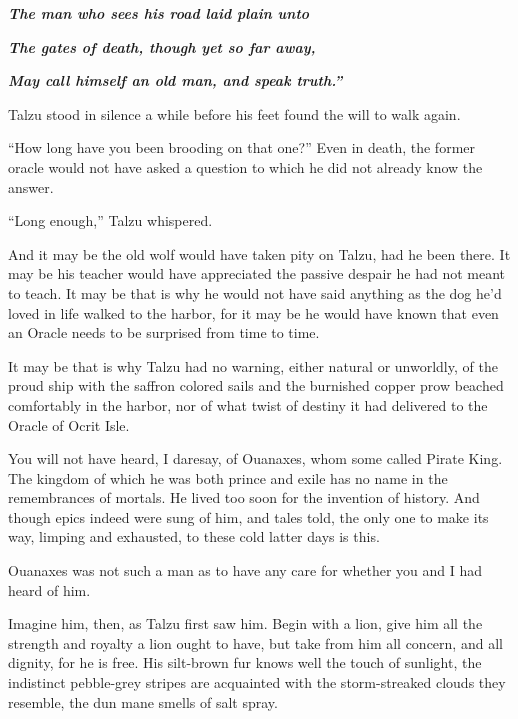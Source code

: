 \emph{\textbf{The man who sees his road laid plain unto}}

\emph{\textbf{The gates of death, though yet so far away,}}

\emph{\textbf{May call himself an old man, and speak truth.''}}

Talzu stood in silence a while before his feet found the will to walk again.

``How long have you been brooding on that one?'' Even in death, the former oracle would not have asked a question to which he did not already know the answer.

``Long enough,'' Talzu whispered.

And it may be the old wolf would have taken pity on Talzu, had he been there. It may be his teacher would have appreciated the passive despair he had not meant to teach. It may be that is why he would not have said anything as the dog he'd loved in life walked to the harbor, for it may be he would have known that even an Oracle needs to be surprised from time to time.

It may be that is why Talzu had no warning, either natural or unworldly, of the proud ship with the saffron colored sails and the burnished copper prow beached comfortably in the harbor, nor of what twist of destiny it had delivered to the Oracle of Ocrit Isle.

You will not have heard, I daresay, of Ouanaxes, whom some called Pirate King. The kingdom of which he was both prince and exile has no name in the remembrances of mortals. He lived too soon for the invention of history. And though epics indeed were sung of him, and tales told, the only one to make its way, limping and exhausted, to these cold latter days is this.

Ouanaxes was not such a man as to have any care for whether you and I had heard of him.

Imagine him, then, as Talzu first saw him. Begin with a lion, give him all the strength and royalty a lion ought to have, but take from him all concern, and all dignity, for he is free. His silt-brown fur knows well the touch of sunlight, the indistinct pebble-grey stripes are acquainted with the storm-streaked clouds they resemble, the dun mane smells of salt spray.

